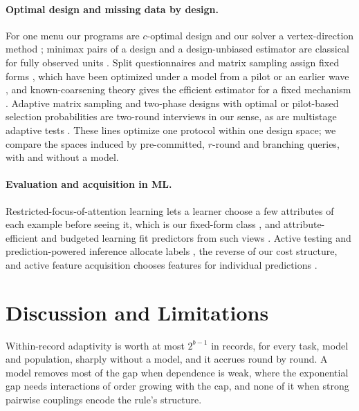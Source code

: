 \documentclass{article}
\begin{document}
\paragraph{Optimal design and missing data by design.} For one menu our programs are $c$-optimal design and our solver a vertex-direction method \citep{elfving1952,fedorov1972,wynn1970,pukelsheim1993,sagnol2011}; minimax pairs of a design and a design-unbiased estimator are classical for fully observed units \citep{stenger1979,gabler1990,aronow2026}. Split questionnaires and matrix sampling assign fixed forms \citep{raghunathan1995,graham2006,thomas2006,chipperfield2009,rhemtulla2012}, which have been optimized under a model from a pilot or an earlier wave \citep{adiguzel2008,jang2022}, and known-coarsening theory gives the efficient estimator for a fixed mechanism \citep{robins1994,tsiatis2006}. Adaptive matrix sampling \citep{gonzalez2008} and two-phase designs with optimal or pilot-based selection probabilities \citep{reilly1995,gilbert2014,mcisaac2015,tao2020,chen2020,chen2022} are two-round interviews in our sense, as are multistage adaptive tests \citep{yamamoto2018,fink2024}. These lines optimize one protocol within one design space; we compare the spaces induced by pre-committed, $r$-round and branching queries, with and without a model.

\paragraph{Evaluation and acquisition in ML.} Restricted-focus-of-attention learning lets a learner choose a few attributes of each example before seeing it, which is our fixed-form class \citep{bendavid1998}, and attribute-efficient and budgeted learning fit predictors from such views \citep{cesa2011,hazan2012,lizotte2003,kapoor2005}. Active testing and prediction-powered inference allocate labels \citep{kossen2021,zrnic2024,angelopoulos2023}, the reverse of our cost structure, and active feature acquisition chooses features for individual predictions \citep{trapeznikov2013,nan2017,covert2023,vonkleist2025}.

\section{Discussion and Limitations}\label{sec:discussion}
Within-record adaptivity is worth at most $2^{b-1}$ in records, for every task, model and population, sharply without a model, and it accrues round by round. A model removes most of the gap when dependence is weak, where the exponential gap needs interactions of order growing with the cap, and none of it when strong pairwise couplings encode the rule's structure. \nDiscussionSentence
\end{document}
